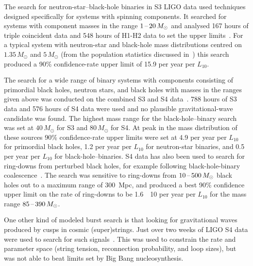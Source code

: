 \documentclass{article}
\begin{document}
The search for neutron-star--black-hole binaries in S3 LIGO data used techniques
designed specifically for systems with spinning components. It searched for
systems with component masses in the range $1\mbox{\,--\,}20\,M_{\odot}$ and analysed 167
hours of triple coincident data and 548 hours of H1-H2 data to set the upper
limits~\cite{Abbott:2008d}. For a typical system with neutron-star and black-hole mass distributions centred on $1.35\,M_{\odot}$ and $5\,M_{\odot}$ (from
the population statistics discussed in~\cite{Abbott:2008a}) this search produced
a 90\% confidence-rate upper limit of 15.9 per year per $L_{10}$.

The search for a wide range of binary systems with components consisting of
primordial black holes, neutron stars, and black holes with masses in the ranges
given above was conducted on the combined S3 and S4 data~\cite{Abbott:2008a}.
788 hours of S3 data and 576 hours of S4 data were used and no plausible
gravitational-wave candidate was found. The highest mass range for the black-hole--binary search was set at $40\,M_{\odot}$ for S3 and $80\,M_{\odot}$ for S4. At peak in the
mass distribution of these sources 90\% confidence-rate upper limits were set at
4.9 per year per $L_{10}$ for primordial black holes, 1.2 per year per $L_{10}$
for neutron-star binaries, and 0.5 per year per $L_{10}$ for black-hole--binaries.
S4 data has also been used to search for ring-downs from perturbed black holes,
for example following black-hole-binary coalescence~\cite{Abbott:2009g}. The
search was sensitive to ring-downs from $10\mbox{\,--\,}500\,M_{\odot}$ black holes out to
a maximum range of 300~Mpc, and produced a best 90\% confidence upper limit on
the rate of ring-downs to be 1.6~\texttimes~10 per year per
$L_{10}$ for the mass range $85\mbox{\,--\,}390\,M_{\odot}$.

One other kind of modeled burst search is that looking for gravitational waves
produced by cusps in cosmic (super)strings. Just over two weeks of LIGO S4 data
were used to search for such signals~\cite{Abbott:2009j}. This was used to
constrain the rate and parameter space (string tension, reconnection
probability, and loop sizes), but was not able to beat limits set by Big Bang
nucleosynthesis.
\end{document}
